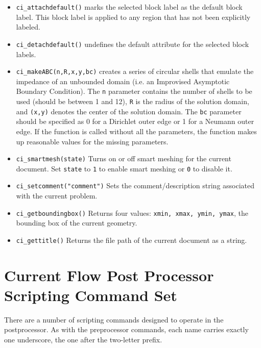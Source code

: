 \begin{itemize}
\item{\tt ci\_attachdefault()} marks the
selected block label as the default block label.  This block label
is applied to any region that has not been explicitly labeled.

\item{\tt ci\_detachdefault()} undefines the default
attribute for the selected block labels.

\item{\tt ci\_makeABC(n,R,x,y,bc)} creates a series of circular shells that emulate the
impedance of an unbounded domain (i.e. an Improvised Asymptotic Boundary
Condition).  The {\tt n} parameter contains the number of shells to be used
(should be between 1 and 12), {\tt R} is the radius of the solution domain, and
{\tt (x,y)} denotes the center of the solution domain.  The {\tt bc} parameter should
be specified as 0 for a Dirichlet outer edge or 1 for a Neumann outer edge.
If the function is called without all the parameters, the function makes up
reasonable values for the missing parameters.

\item{\tt ci\_smartmesh(state)} Turns on or off smart meshing for the current document.  Set {\tt state} to {\tt 1} to enable smart meshing or {\tt 0} to disable it.

\item{\tt ci\_setcomment("comment")} Sets the comment/description string associated with the current problem.

\item{\tt ci\_getboundingbox()} Returns four values: {\tt xmin, xmax, ymin, ymax}, the bounding box of the current geometry.

\item{\tt ci\_gettitle()} Returns the file path of the current document as a string.

\end{itemize}

\section{Current Flow Post Processor Scripting Command Set}

There are a number of scripting commands designed to operate in
the postprocessor. As with the preprocessor commands, each name
carries exactly one underscore, the one after the two-letter prefix.

